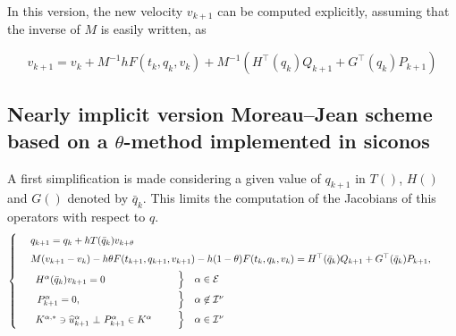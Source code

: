In this version, the new velocity $v_{k+1}$ can be computed explicitly, assuming that the inverse of $M$ is easily written, as

\begin{equation}
  \label{eq:Moreau--Jean-theta--explicit-v}
  v_{k+1}   =  v_k + M^{-1} h  F(t_{k}, q_{k},v_{k}) +  M^{-1} (H^\top(q_{k}) Q_{k+1}+  G^\top(q_{k}) P_{k+1})
\end{equation}


\subsection{Nearly implicit version Moreau--Jean scheme based on a  $\theta$-method implemented in siconos}

A first simplification is made considering a given value of $q_{k+1}$ in $T()$, $H()$ and $G()$ denoted by $\bar q_k$. This limits the computation of the Jacobians of this operators with respect to $q$.
\begin{equation}
    \label{eq:Moreau--Jean-theta-nearly}
    \begin{cases}
      ~~\begin{array}{l}
        q_{k+1} = q_{k} + h T(\bar q_k) v_{k+\theta} \quad \\[1ex]
        M(v_{k+1}-v_k) - h  \theta F(t_{k+1}, q_{k+1},v_{k+1}) - h (1- \theta) F(t_{k}, q_{k},v_{k})  =  H^\top(\bar q_k) Q_{k+1} + G^\top(\bar q_k) P_{k+1},\quad\,\\[1ex]
      \end{array}\\
      ~~\begin{array}{lcl}
        \begin{array}{l}
          H^\alpha(\bar q_k) v_{k+1}  =  0\\
        \end{array} & \left. \begin{array}{l}
          \vphantom{H^\alpha(q_{k+1}) v_{k+1}  =  0}\\[1ex]
        \end{array}\right\}    &\alpha \in \mathcal E  \\[1ex]
      ~~P_{k+1}^\alpha= 0, &
      \left. \begin{array}{l}
          \vphantom{P_{k+1}^\alpha= 0,  \delta^\alpha_{k+1}=0}\\[1ex]
        \end{array}\right\}   & \alpha \not\in \mathcal I^\nu \\[1ex]
      \begin{array}{l}
          {K}^{\alpha,*} \ni \widehat u_{k+1}^\alpha~ \bot~ P_{k+1}^\alpha \in {K}^\alpha \\
      \end{array} &
      \left.\begin{array}{l}
          \vphantom{{K}^{\alpha,*} \ni \widehat u_{k+1}^\alpha~ \bot~ P_{k+1}^\alpha \in {K}^\alpha} \\
        \end{array}\right\}
      &\alpha \in \mathcal I^\nu\\
  \end{array}
\end{cases}
\end{equation}
